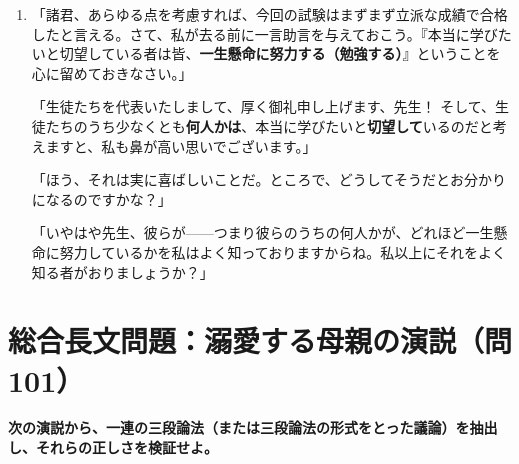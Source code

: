 \documentclass[a4paper,11pt,openany]{ltjsbook}
\begin{document}
\begin{enumerate}[label=\textbf{\arabic*.}, start=96]
「でも、いくつかのゼラニウムは赤いわよね、そうじゃなくて？」

「それは否定しないさ。だが、それがどうしたっていうんだ？ まさか君は、あの花のうちのいくつかがゼラニウムだなんて言うつもりじゃあるまいね！」

「もちろん、あなたに論理の筋道をたどるだけの分別がおありなら、そう教えてあげるところよ！ でも、\textbf{あなた}みたいな人に何かを証明してあげたところで、いったい何の役に立つのかしらね？」
\item 「諸君、あらゆる点を考慮すれば、今回の試験はまずまず立派な成績で合格したと言える。さて、私が去る前に一言助言を与えておこう。『本当に学びたいと切望している者は皆、\textbf{一生懸命に努力する（勉強する）}』ということを心に留めておきなさい。」

「生徒たちを代表いたしまして、厚く御礼申し上げます、先生！ そして、生徒たちのうち少なくとも\textbf{何人かは}、本当に学びたいと\textbf{切望して}いるのだと考えますと、私も鼻が高い思いでございます。」

「ほう、それは実に喜ばしいことだ。ところで、どうしてそうだとお分かりになるのですかな？」

「いやはや先生、彼らが——つまり彼らのうちの何人かが、どれほど一生懸命に努力しているかを私はよく知っておりますからね。私以上にそれをよく知る者がおりましょうか？」
\end{enumerate}

\vspace{4mm}
\section*{総合長文問題：溺愛する母親の演説（問101）}
\noindent\textbf{次の演説から、一連の三段論法（または三段論法の形式をとった議論）を抽出し、それらの正しさを検証せよ。}

\end{document}
